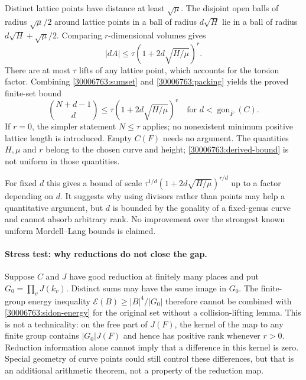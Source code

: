 \documentclass[11pt,a4paper]{article}
\numberwithin{equation}{section}
\begin{document}
Distinct lattice points have distance at least $\sqrt\mu$.
The disjoint open balls of radius $\sqrt\mu/2$ around lattice points in
a ball of radius $d\sqrt H$ lie in a ball of radius
$d\sqrt H+\sqrt\mu/2$. Comparing $r$-dimensional volumes gives
\begin{equation}\label{30006763:packing}
 |dA|\le\tau\left(1+2d\sqrt{H/\mu}\right)^r.
\end{equation}
There are at most $\tau$ lifts of any lattice point, which accounts for
the torsion factor. Combining \eqref{30006763:sumset} and
\eqref{30006763:packing} yields the proved finite-set bound
\begin{equation}\label{30006763:derived-bound}
 \boxed{\displaystyle
 \binom{N+d-1}{d}\le
 \tau\left(1+2d\sqrt{H/\mu}\right)^r
 \quad\text{for }d<\operatorname{gon}_{\overline F}(C).}
\end{equation}
If $r=0$, the simpler statement $N\le\tau$ applies; no nonexistent
minimum positive lattice length is introduced. Empty $C(F)$ needs no
argument. The quantities $H,\mu$ and $r$ belong to the chosen curve and
height; \eqref{30006763:derived-bound} is not uniform in those quantities.

For fixed $d$ this gives a bound of scale
$\tau^{1/d}(1+2d\sqrt{H/\mu})^{r/d}$ up to a factor depending on $d$.
It suggests why using divisors rather than points may help a quantitative
argument, but $d$ is bounded by the gonality of a fixed-genus curve and
cannot absorb arbitrary rank. No improvement over the strongest known
uniform Mordell--Lang bounds is claimed.

\paragraph{Stress test: why reductions do not close the gap.}
Suppose $C$ and $J$ have good reduction at finitely many places and put
$G_0=\prod_v J(k_v)$. Distinct sums may have the same image in $G_0$.
The finite-group energy inequality
$\mathcal E(B)\ge |B|^4/|G_0|$ therefore cannot be combined with
\eqref{30006763:sidon-energy} for the original set without a collision-lifting
lemma. This is not a technicality: on the free part of $J(F)$, the
kernel of the map to any finite group contains $|G_0|J(F)$ and hence has
positive rank whenever $r>0$. Reduction information alone cannot imply
that a difference in this kernel is zero. Special geometry of curve
points could still control these differences, but that is an additional
arithmetic theorem, not a property of the reduction map.
\end{document}
